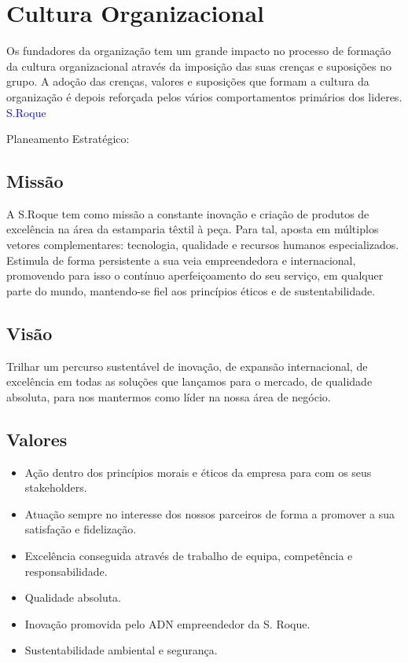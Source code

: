 {
\newpage
\section{Cultura Organizacional}
\qquad Os fundadores da organização tem um grande impacto no processo de formação da cultura organizacional através da imposição das suas crenças e suposições no grupo. A adoção das crenças, valores e suposições que formam a cultura da organização é depois reforçada pelos vários comportamentos primários dos lideres.\\

\textcolor{blue}{\Large{S.Roque}}

Planeamento Estratégico:

\subsection{Missão}

A S.Roque tem como missão a constante inovação e criação de produtos de excelência na área da estamparia têxtil à peça. Para tal, aposta em múltiplos vetores complementares: tecnologia, qualidade e recursos humanos especializados. Estimula de forma persistente a sua veia empreendedora e internacional, promovendo para isso o contínuo aperfeiçoamento do seu serviço, em qualquer parte do mundo, mantendo-se fiel aos princípios éticos e de sustentabilidade.

\subsection{Visão}
Trilhar um percurso sustentável de inovação, de expansão internacional, de excelência em todas as soluções que lançamos para o mercado, de qualidade absoluta, para nos mantermos como líder na nossa área de negócio.

\subsection{Valores}
\begin{itemize}
\item Ação dentro dos princípios morais e éticos da empresa para com os seus stakeholders.
\item Atuação sempre no interesse dos nossos parceiros de forma a promover a sua satisfação e fidelização.
\item Excelência conseguida através de trabalho de equipa, competência e responsabilidade.
\item Qualidade absoluta.
\item Inovação promovida pelo ADN empreendedor da S. Roque.
\item Sustentabilidade ambiental e segurança.
\end{itemize}\par

}
